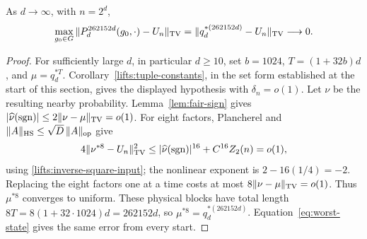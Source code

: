 \begin{proposition}\label{lifts:neumann-theorem}
As $d\to\infty$, with $n=2^d$,
\[
 \max_{g_0\in G}\|P_d^{262152d}(g_0,\cdot)-U_n\|_{\mathrm{TV}}
 =\|q_d^{*(262152d)}-U_n\|_{\mathrm{TV}}\longrightarrow0.
\]
\end{proposition}
\begin{proof}
For sufficiently large $d$, in particular $d\ge10$, set $b=1024$,
$T=(1+32b)d$, and $\mu=q_d^{*T}$.
Corollary~\ref{lifts:tuple-constants}, in the set form established at
the start of this section, gives the displayed hypothesis with
$\delta_n=o(1)$. Let $\nu$ be the resulting nearby probability.
Lemma~\ref{lem:fair-sign} gives
$|\widehat\nu(\operatorname{sgn})|\le2\|\nu-\mu\|_{\mathrm{TV}}=o(1)$.
For eight factors, Plancherel and
$\|A\|_{\mathrm{HS}}\le\sqrt D\,\|A\|_{\mathrm{op}}$ give
\[
 4\|\nu^{*8}-U_n\|_{\mathrm{TV}}^2
 \le|\widehat\nu(\operatorname{sgn})|^{16}
      +C^{16}Z_2(n)=o(1),
\]
using \eqref{lifts:inverse-square-input}; the nonlinear exponent is
$2-16(1/4)=-2$. Replacing the eight factors one at a time costs at
most $8\|\nu-\mu\|_{\mathrm{TV}}=o(1)$. Thus $\mu^{*8}$ converges to uniform.
These physical blocks have total length
$8T=8(1+32\cdot1024)d=262152d$, so
$\mu^{*8}=q_d^{*(262152d)}$. Equation~\eqref{eq:worst-state}
gives the same error from every start.
\end{proof}
